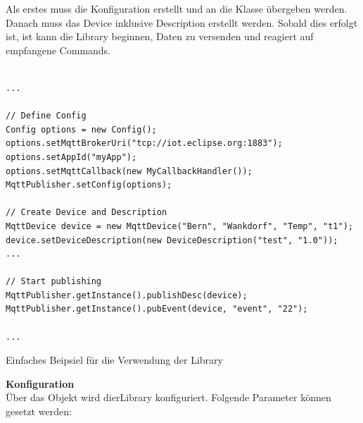 Als erstes muss die Konfiguration erstellt und an die Klasse  übergeben werden. Danach muss das Device inklusive Description erstellt werden. Sobald dies erfolgt ist, ist kann die Library beginnen, Daten zu versenden und reagiert auf empfangene Commands.

\begin{listing}[H]
\begin{verbatim}

...

// Define Config
Config options = new Config();
options.setMqttBrokerUri("tcp://iot.eclipse.org:1883");
options.setAppId("myApp");
options.setMqttCallback(new MyCallbackHandler());
MqttPublisher.setConfig(options);
	
// Create Device and Description	
MqttDevice device = new MqttDevice("Bern", "Wankdorf", "Temp", "t1");	
device.setDeviceDescription(new DeviceDescription("test", "1.0"));
...

// Start publishing
MqttPublisher.getInstance().publishDesc(device);
MqttPublisher.getInstance().pubEvent(device, "event", "22");

...

\end{verbatim}
\caption{Einfaches Beipsiel für die Verwendung der Library}
\end{listing}

\textbf{Konfiguration} \\
Über das  Objekt wird dierLibrary konfiguriert. Folgende Parameter können gesetzt werden:



